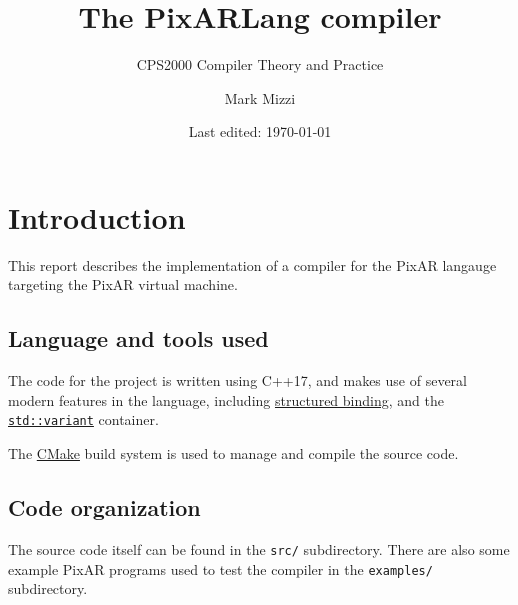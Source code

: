 \documentclass[11pt,a4paper]{scrartcl}
\title{The PixARLang compiler}
\subtitle{CPS2000 Compiler Theory and Practice}
\author{Mark Mizzi}
\date{Last edited: \today}
\begin{document}
\maketitle

\tableofcontents

\newpage

\section{Introduction}

This report describes the implementation of a compiler for the PixAR langauge targeting the PixAR virtual machine.

\subsection{Language and tools used}

The code for the project is written using C++17, and makes use of several modern features in the language, including \href{https://en.cppreference.com/mwiki/index.php?title=cpp/language/structured_binding&oldid=150915}{structured binding}, and the \href{https://en.cppreference.com/mwiki/index.php?title=cpp/utility/variant&oldid=150622}{\Verb|std::variant|} container.

The \href{https://cmake.org}{CMake} build system is used to manage and compile the source code.

\subsection{Code organization}

The source code itself can be found in the \verb|src/| subdirectory. There are also some example PixAR programs used to test the compiler in the \verb|examples/| subdirectory.
\end{document}
